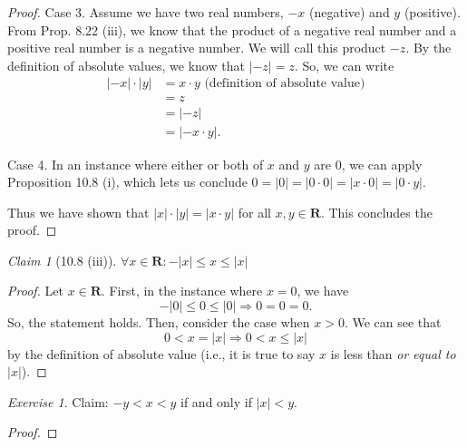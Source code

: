 \documentclass[12pt,oneside]{amsart}
\theoremstyle{remark}
\newtheorem{exer}{Exercise}
\newtheorem{claim}{Claim}[exer]
\newcommand{\bfR}{\mathbf{R}}
\begin{document}
\begin{proof}
Case 3. Assume we have two real numbers, $-x$ (negative) and $y$ (positive). From Prop. 8.22 (iii), we know that the product of a negative real number and a positive real number is a negative number. We will call this product $-z$. By the definition of absolute values, we know that $|-z| = z$. So, we can write
\begin{equation}
\begin{split}
|-x| \cdot |y| &= x \cdot y \text{ (definition of absolute value)} \\
               &= z \\
               &= |-z| \\
               &= |-x \cdot y|.
\end{split}
\end{equation}

Case 4. In an instance where either or both of $x$ and $y$ are 0, we can apply Proposition 10.8 (i), which lets us conclude $0 = |0| = |0 \cdot 0| = |x \cdot 0| = |0 \cdot y|$.

Thus we have shown that $|x| \cdot |y| = |x \cdot y|$ for all $x, y \in \bfR$. This concludes the proof.
\end{proof}

\begin{claim}[10.8 (iii)]
$\forall x \in \bfR: -|x| \leq x \leq |x|$
\end{claim}
\begin{proof}
Let $x \in \bfR$. First, in the instance where $x = 0$, we have \[ -|0| \leq 0 \leq |0| \Rightarrow 0 = 0 = 0. \] So, the statement holds. Then, consider the case when $x > 0$. We can see that \[ 0 < x = |x| \Rightarrow 0 < x \leq |x| \] by the definition of absolute value (i.e., it is true to say $x$ is less than \emph{or equal to} $|x|$).
\end{proof}

%
%
%
%
\newpage
\begin{exer}
Claim: $-y < x < y$ if and only if $|x| < y$.
\end{exer}
\begin{proof}

\end{proof}
\end{document}
